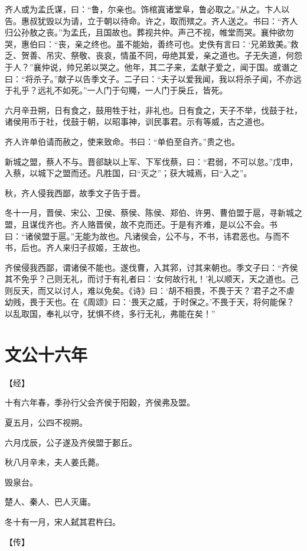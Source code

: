\documentclass[a4paper,12pt,UTF8,twoside]{ctexbook}
\begin{document}
齐人或为孟氏谋，曰：“鲁，尔亲也。饰棺寘诸堂阜，鲁必取之。”从之。卞人以告。惠叔犹毁以为请，立于朝以待命。许之，取而殡之。齐人送之。书曰：“齐人归公孙敖之丧。”为孟氏，且国故也。葬视共仲。声己不视，帷堂而哭。襄仲欲勿哭，惠伯曰：“丧，亲之终也。虽不能始，善终可也。史佚有言曰：‘兄弟致美。’救乏、贺善、吊灾、祭敬、丧哀，情虽不同，毋绝其爱，亲之道也。子无失道，何怨于人？”襄仲说，帅兄弟以哭之。他年，其二子来，孟献子爱之，闻于国。或谮之曰：“将杀子。”献子以告季文子。二子曰：“夫子以爱我闻，我以将杀子闻，不亦远于礼乎？远礼不如死。”一人门于句鼆，一人门于戾丘，皆死。

六月辛丑朔，日有食之，鼓用牲于社，非礼也。日有食之，天子不举，伐鼓于社，诸侯用币于社，伐鼓于朝，以昭事神，训民事君。示有等威，古之道也。

齐人许单伯请而赦之，使来致命。书曰：“单伯至自齐。”贵之也。

新城之盟，蔡人不与。晋郤缺以上军、下军伐蔡，曰：“君弱，不可以怠。”戊申，入蔡，以城下之盟而还。凡胜国，曰“灭之”；获大城焉，曰“入之”。

秋，齐人侵我西鄙，故季文子告于晋。

冬十一月，晋侯、宋公、卫侯、蔡侯、陈侯、郑伯、许男、曹伯盟于扈，寻新城之盟，且谋伐齐也。齐人赂晋侯，故不克而还。于是有齐难，是以公不会。书曰：“诸侯盟于扈。”无能为故也。凡诸侯会，公不与，不书，讳君恶也。与而不书，后也。齐人来归子叔姬，王故也。

齐侯侵我西鄙，谓诸侯不能也。遂伐曹，入其郛，讨其来朝也。季文子曰：“齐侯其不免乎？己则无礼，而讨于有礼者曰：‘女何故行礼！’礼以顺天，天之道也。己则反天，而又以讨人，难以免矣。《诗》曰：‘胡不相畏，不畏于天？’君子之不虐幼贱，畏于天也。在《周颂》曰：‘畏天之威，于时保之。’不畏于天，将何能保？以乱取国，奉礼以守，犹惧不终，多行无礼，弗能在矣！”

\section{文公十六年}



【经】

十有六年春，季孙行父会齐侯于阳穀，齐侯弗及盟。

夏五月，公四不视朔。

六月戊辰，公子遂及齐侯盟于郪丘。

秋八月辛未，夫人姜氏薨。

毁泉台。

楚人、秦人、巴人灭庸。

冬十有一月，宋人弑其君杵臼。

【传】
\end{document}
